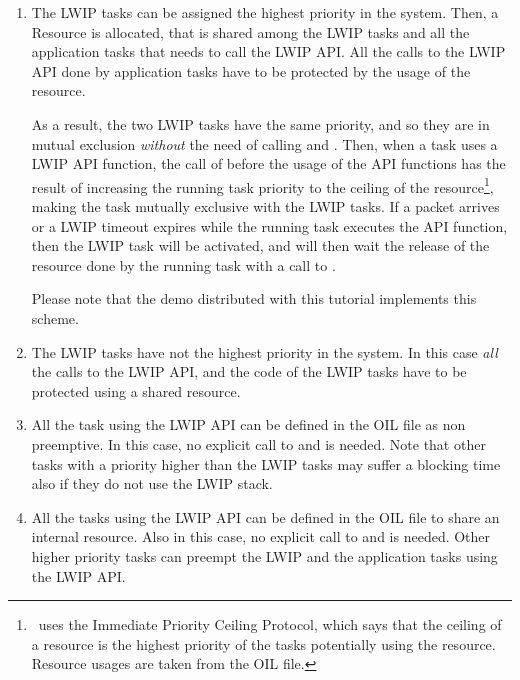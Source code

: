 \begin{enumerate}
\item The LWIP tasks can be assigned the highest priority in the
  system. Then, a Resource is allocated, that is shared among the LWIP
  tasks and all the application tasks that needs to call the LWIP
  API. All the calls to the LWIP API done by application tasks have to
  be protected by the usage of the resource.

  As a result, the two LWIP tasks have the same priority, and so they
  are in mutual exclusion {\em without} the need of calling
   and . Then, when a task
  uses a LWIP API function, the call of  before the
  usage of the API functions has the result of increasing the running
  task priority to the ceiling of the resource\footnote{\ee\ uses the
  Immediate Priority Ceiling Protocol, which says that the ceiling of
  a resource is the highest priority of the tasks potentially using
  the resource. Resource usages are taken from the OIL file.}, making
  the task mutually exclusive with the LWIP tasks. If a packet arrives
  or a LWIP timeout expires while the running task executes the API
  function, then the LWIP task will be activated, and will then wait
  the release of the resource done by the running task with a call to
  .

  Please note that the demo distributed with this tutorial implements
  this scheme.

\item The LWIP tasks have not the highest priority in the system. In
  this case {\em all} the calls to the LWIP API, and the code of the
  LWIP tasks have to be protected using a shared resource.

\item All the task using the LWIP API can be defined in the OIL file
  as non preemptive. In this case, no explicit call to
   and  is needed. Note
  that other tasks with a priority higher than the LWIP tasks may
  suffer a blocking time also if they do not use the LWIP stack.

\item All the tasks using the LWIP API can be defined in the OIL file
  to share an internal resource. Also in this case, no explicit call
  to  and  is
  needed. Other higher priority tasks can preempt the LWIP and the
  application tasks using the LWIP API.
\end{enumerate}
